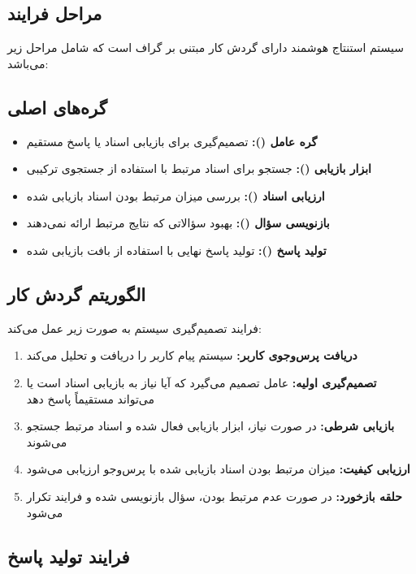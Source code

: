 \subsection{مراحل فرایند}
سیستم استنتاج هوشمند  دارای گردش کار مبتنی بر گراف است که شامل مراحل زیر می‌باشد:

\subsection*{گره‌های اصلی}
\begin{itemize}
    \item \textbf{گره عامل ():} تصمیم‌گیری برای بازیابی اسناد یا پاسخ مستقیم
    \item \textbf{ابزار بازیابی ():} جستجو برای اسناد مرتبط با استفاده از جستجوی ترکیبی
    \item \textbf{ارزیابی اسناد ():} بررسی میزان مرتبط بودن اسناد بازیابی شده
    \item \textbf{بازنویسی سؤال ():} بهبود سؤالاتی که نتایج مرتبط ارائه نمی‌دهند
    \item \textbf{تولید پاسخ ():} تولید پاسخ نهایی با استفاده از بافت بازیابی شده
\end{itemize}

\subsection*{الگوریتم گردش کار}
فرایند تصمیم‌گیری سیستم به صورت زیر عمل می‌کند:

\begin{enumerate}
    \item \textbf{دریافت پرس‌وجوی کاربر:} سیستم پیام کاربر را دریافت و تحلیل می‌کند
    \item \textbf{تصمیم‌گیری اولیه:} عامل تصمیم می‌گیرد که آیا نیاز به بازیابی اسناد است یا می‌تواند مستقیماً پاسخ دهد
    \item \textbf{بازیابی شرطی:} در صورت نیاز، ابزار بازیابی فعال شده و اسناد مرتبط جستجو می‌شوند
    \item \textbf{ارزیابی کیفیت:} میزان مرتبط بودن اسناد بازیابی شده با پرس‌وجو ارزیابی می‌شود
    \item \textbf{حلقه بازخورد:} در صورت عدم مرتبط بودن، سؤال بازنویسی شده و فرایند تکرار می‌شود
\end{enumerate}


\subsection{فرایند تولید پاسخ}

